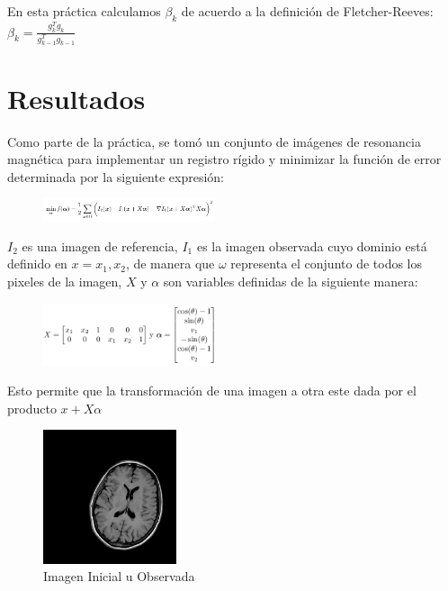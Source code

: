 \documentclass[10pt,journal,compsoc]{styles/IEEEtran}
\begin{document}
En esta pr\'actica calculamos $\beta_k$ de acuerdo a la definición de Fletcher-Reeves:\\

$\beta_k=\frac{g_k^T g_k}{g_{k-1}^T g_{k-1}}$\\




 
\section{Resultados}

Como parte de la pr\'actica, se tom\'o un conjunto de im\'agenes de resonancia magn\'etica para implementar un registro r\'igido y minimizar la funci\'on de error determinada por la siguiente expresi\'on:\\

\begin{figure}[hbtp]
\centering
\includegraphics[width=0.45\textwidth]{error.png}
\caption*{}
\end{figure}

$I_2$ es una imagen de referencia, $I_1$ es la imagen observada cuyo dominio est\'a definido en $x={x_1,x_2}$, de manera que $\omega$ representa el conjunto de todos los pixeles de la imagen, $X$ y $\alpha$ son variables definidas de la siguiente manera:\\

\begin{figure}[hbtp]
\centering
\includegraphics[width=0.45\textwidth]{variable.png}
\caption*{}
\end{figure}

Esto permite que la transformaci\'on de una imagen a otra este dada por el producto $x+X\alpha$\\


\begin{figure}[hbtp]
\centering
\includegraphics[width=0.35\textwidth]{mriC.png}
\caption{Imagen Inicial u Observada}
\end{figure}
\end{document}
